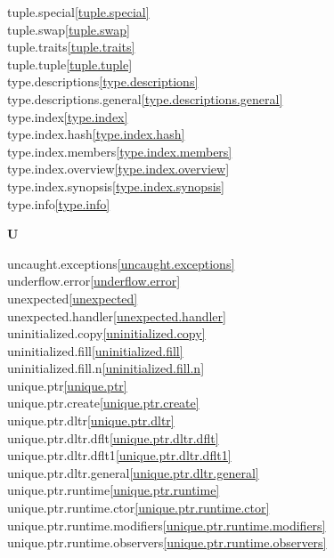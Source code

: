 \begin{multicols}{2}
tuple.special\quad\ref{tuple.special}\\
tuple.swap\quad\ref{tuple.swap}\\
tuple.traits\quad\ref{tuple.traits}\\
tuple.tuple\quad\ref{tuple.tuple}\\
type.descriptions\quad\ref{type.descriptions}\\
type.descriptions.general\quad\ref{type.descriptions.general}\\
type.index\quad\ref{type.index}\\
type.index.hash\quad\ref{type.index.hash}\\
type.index.members\quad\ref{type.index.members}\\
type.index.overview\quad\ref{type.index.overview}\\
type.index.synopsis\quad\ref{type.index.synopsis}\\
type.info\quad\ref{type.info}\\
\par \textbf{U}\par
uncaught.exceptions\quad\ref{uncaught.exceptions}\\
underflow.error\quad\ref{underflow.error}\\
unexpected\quad\ref{unexpected}\\
unexpected.handler\quad\ref{unexpected.handler}\\
uninitialized.copy\quad\ref{uninitialized.copy}\\
uninitialized.fill\quad\ref{uninitialized.fill}\\
uninitialized.fill.n\quad\ref{uninitialized.fill.n}\\
unique.ptr\quad\ref{unique.ptr}\\
unique.ptr.create\quad\ref{unique.ptr.create}\\
unique.ptr.dltr\quad\ref{unique.ptr.dltr}\\
unique.ptr.dltr.dflt\quad\ref{unique.ptr.dltr.dflt}\\
unique.ptr.dltr.dflt1\quad\ref{unique.ptr.dltr.dflt1}\\
unique.ptr.dltr.general\quad\ref{unique.ptr.dltr.general}\\
unique.ptr.runtime\quad\ref{unique.ptr.runtime}\\
unique.ptr.runtime.ctor\quad\ref{unique.ptr.runtime.ctor}\\
unique.ptr.runtime.modifiers\quad\ref{unique.ptr.runtime.modifiers}\\
unique.ptr.runtime.observers\quad\ref{unique.ptr.runtime.observers}\\

\end{multicols}
